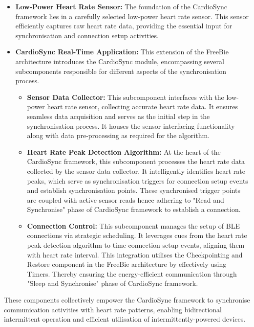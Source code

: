 \begin{itemize}
    \item \textbf{Low-Power Heart Rate Sensor:}
    The foundation of the CardioSync framework lies in a carefully selected low-power heart rate sensor. This sensor efficiently captures raw heart rate data, providing the essential input for synchronisation and connection setup activities.

    \item \textbf{CardioSync Real-Time Application:} This extension of the FreeBie architecture introduces the CardioSync module, encompassing several subcomponents responsible for different aspects of the synchronisation process.
    \begin{itemize}
        \item \textbf{Sensor Data Collector:} This subcomponent interfaces with the low-power heart rate sensor, collecting accurate heart rate data. It ensures seamless data acquisition and serves as the initial step in the synchronisation process. It houses the sensor interfacing functionality along with data pre-processing as required for the algorithm.
        
        \item \textbf{Heart Rate Peak Detection Algorithm:} At the heart of the CardioSync framework, this subcomponent processes the heart rate data collected by the sensor data collector. It intelligently identifies heart rate peaks, which serve as synchronisation triggers for connection setup events and establish synchronisation points. These synchronised trigger points are coupled with active sensor reads hence adhering to "Read and Synchronise" phase of CardioSync framework to establish a connection.
        
        \item \textbf{Connection Control:} This subcomponent manages the setup of BLE connections via strategic scheduling. It leverages cues from the heart rate peak detection algorithm to time connection setup events, aligning them with heart rate interval. This integration utilises the Checkpointing and Restore component in the FreeBie architecture by effectively using Timers. Thereby ensuring the energy-efficient communication through "Sleep and Synchronise" phase of CardioSync framework.
    \end{itemize}
\end{itemize}
\noindent These components collectively empower the CardioSync framework to synchronise communication activities with heart rate patterns, enabling bidirectional intermittent operation and efficient utilisation of intermittently-powered devices.

